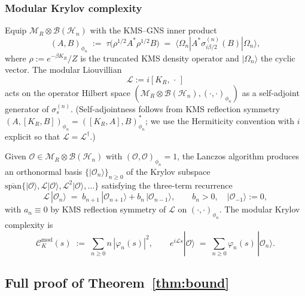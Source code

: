 \documentclass[12pt,a4paper]{article}
\begin{document}
\subsubsection{Modular Krylov complexity}
\label{sssec:A61-krylov}

Equip $\mathcal{M}_R \otimes \mathcal{B}(\mathcal{H}_n)$ with the
KMS--GNS inner product
\begin{equation}
  (A,B)_{\phi_n} \;:=\; \tau\!\bigl(\rho^{1/2} A^* \rho^{1/2} B\bigr)
  \;=\; \langle \Omega_n | A^* \sigma_{i\beta/2}^{(n)}(B) |\Omega_n \rangle,
  \label{eq:A61-gns}
\end{equation}
where $\rho := e^{-\beta K_R}/Z$ is the truncated KMS density operator
and $|\Omega_n\rangle$ the cyclic vector. The modular Liouvillian
\begin{equation}
  \mathcal{L} := i [K_R,\,\cdot\,]
  \label{eq:A61-liouv}
\end{equation}
acts on the operator Hilbert space
$(\mathcal{M}_R \otimes \mathcal{B}(\mathcal{H}_n), (\cdot,\cdot)_{\phi_n})$
as a self-adjoint generator of $\sigma_s^{(n)}$. (Self-adjointness
follows from KMS reflection symmetry
$(A, [K_R, B])_{\phi_n} = ([K_R, A], B)_{\phi_n}^*$; we use the
Hermiticity convention with $i$ explicit so that
$\mathcal{L} = \mathcal{L}^\dagger$.)

Given $\mathcal{O} \in \mathcal{M}_R \otimes \mathcal{B}(\mathcal{H}_n)$
with $(\mathcal{O},\mathcal{O})_{\phi_n} = 1$, the Lanczos algorithm
produces an orthonormal basis $\{|\mathcal{O}_n\rangle\}_{n\ge 0}$ of
the Krylov subspace
$\overline{\mathrm{span}}\{|\mathcal{O}\rangle, \mathcal{L}|\mathcal{O}\rangle, \mathcal{L}^2|\mathcal{O}\rangle, \ldots\}$
satisfying the three-term recurrence
\begin{equation}
  \mathcal{L}\,|\mathcal{O}_n\rangle
  \;=\; b_{n+1}\,|\mathcal{O}_{n+1}\rangle + b_n\,|\mathcal{O}_{n-1}\rangle,
  \qquad
  b_n > 0,\quad |\mathcal{O}_{-1}\rangle := 0,
  \label{eq:A61-lanczos}
\end{equation}
with $a_n \equiv 0$ by KMS reflection symmetry of $\mathcal{L}$ on
$(\cdot,\cdot)_{\phi_n}$. The modular Krylov complexity is
\begin{equation}
  \mathcal{C}_K^{\mathrm{mod}}(s)
  \;:=\;
  \sum_{n \ge 0} n\,|\varphi_n(s)|^2,
  \qquad
  e^{i\mathcal{L}s}|\mathcal{O}\rangle
  \;=\;
  \sum_{n \ge 0} \varphi_n(s)\,|\mathcal{O}_n\rangle.
  \label{eq:A61-CKmod}
\end{equation}

\subsection{Full proof of Theorem~\ref{thm:bound}}
\label{ssec:A61-proof}
\end{document}
